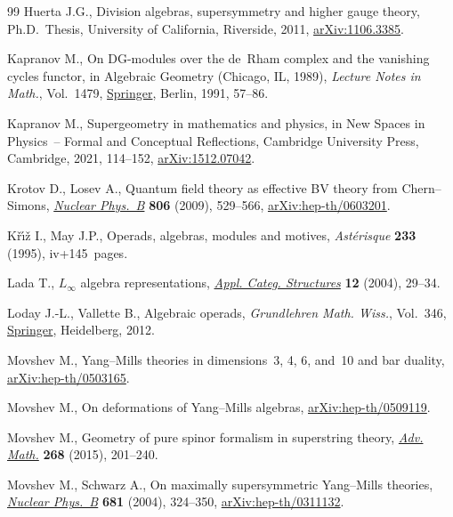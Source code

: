 \begin{thebibliography}{99}
Huerta J.G., Division algebras, supersymmetry and higher gauge theory, Ph.D.~Thesis, {U}niversity of California, Riverside, 2011, \href{https://arxiv.org/abs/1106.3385}{arXiv:1106.3385}.

Kapranov M., On {DG}-modules over the de~{R}ham complex and the vanishing
 cycles functor, in Algebraic {G}eometry ({C}hicago, {IL}, 1989),
 \textit{Lecture Notes in Math.}, Vol.~1479, \href{https://doi.org/10.1007/BFb0086264}{Springer}, Berlin, 1991, 57--86.

Kapranov M., Supergeometry in mathematics and physics, in New Spaces in
 Physics~-- Formal and Conceptual Reflections, Cambridge University Press,
 Cambridge, 2021, 114--152, \href{https://arxiv.org/abs/1512.07042}{arXiv:1512.07042}.

Krotov D., Losev A., Quantum field theory as effective {BV} theory from
 {C}hern--{S}imons, \href{https://doi.org/10.1016/j.nuclphysb.2008.07.021}{\textit{Nuclear Phys.~B}} \textbf{806} (2009), 529--566,
 \href{https://arxiv.org/abs/hep-th/0603201}{arXiv:hep-th/0603201}.

K\v{r}\'{\i}\v{z} I., May J.P., Operads, algebras, modules and motives,
 \textit{Ast\'erisque} \textbf{233} (1995), iv+145~pages.

Lada T., {$L_\infty$} algebra representations, \href{https://doi.org/10.1023/B:APCS.0000013809.71153.30}{\textit{Appl. Categ. Structures}}
 \textbf{12} (2004), 29--34.

Loday J.-L., Vallette B., Algebraic operads, \textit{Grundlehren Math. Wiss.},
 Vol.~346, \href{https://doi.org/10.1007/978-3-642-30362-3}{Springer}, Heidelberg, 2012.

Movshev M., {Y}ang--{M}ills theories in dimensions~3, 4, 6, and~10 and bar
 duality, \href{https://arxiv.org/abs/hep-th/0503165}{arXiv:hep-th/0503165}.

Movshev M., On deformations of {Y}ang--{M}ills algebras,
 \href{https://arxiv.org/abs/hep-th/0509119}{arXiv:hep-th/0509119}.

Movshev M., Geometry of pure spinor formalism in superstring theory,
 \href{https://doi.org/10.1016/j.aim.2014.09.014}{\textit{Adv. Math.}} \textbf{268} (2015), 201--240.

Movshev M., Schwarz A., On maximally supersymmetric {Y}ang--{M}ills theories,
 \href{https://doi.org/10.1016/j.nuclphysb.2003.12.033}{\textit{Nuclear Phys.~B}} \textbf{681} (2004), 324--350,
 \href{https://arxiv.org/abs/hep-th/0311132}{arXiv:hep-th/0311132}.


\end{thebibliography}
